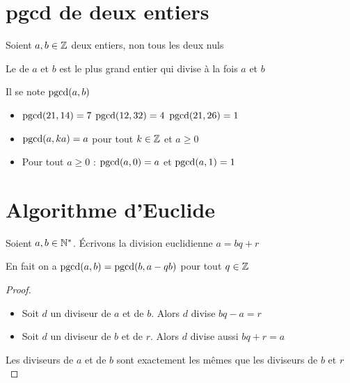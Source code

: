 \section{pgcd de deux entiers}

\begin{frame}
Soient $a,b\in\mathbb{Z}$ deux entiers, non tous les deux nuls

\begin{mydefinition}
Le  de $a$ et $b$ 
est le plus grand entier qui divise à la fois $a$ et $b$
\end{mydefinition}

\pause

Il se note $\mathop{\text{pgcd}}\nolimits(a,b)$

\pause
\bigskip

\begin{exemple}
\begin{itemize}
  \item $\mathop{\text{pgcd}}\nolimits(21,14)=7$ \quad\pause $\mathop{\text{pgcd}}\nolimits(12,32)=4$ \quad\pause $\mathop{\text{pgcd}}\nolimits(21,26)=1$
\pause
  \item $\mathop{\text{pgcd}}\nolimits(a,ka)=a$ \quad pour tout $k \in \mathbb{Z}$ et $a \ge 0$
\pause
  \item Pour tout $a\ge 0$ : $\mathop{\text{pgcd}}\nolimits(a,0)=a$ \pause \quad et \quad  $\mathop{\text{pgcd}}\nolimits(a,1)=1$
\end{itemize}
\end{exemple}
\end{frame}

\section{Algorithme d'Euclide}

\begin{frame}

Soient $a,b \in \mathbb{N}^*$. \'Ecrivons la division euclidienne $a=bq+r$
\begin{lemme}
\label{lem:algoeuclide}
\end{lemme}

\pause
\medskip

En fait on a $\mathop{\text{pgcd}}\nolimits(a,b) = \mathop{\text{pgcd}}\nolimits(b,a-qb)$ pour tout $q\in \mathbb{Z}$

\pause
\medskip

\begin{proof}

\begin{itemize}
  \item Soit $d$ un diviseur de $a$ et de $b$. Alors $d$ divise $bq-a=r$
\pause
  \item Soit $d$ un diviseur de $b$ et de $r$. Alors $d$ divise aussi $bq+r=a$
\end{itemize}
\pause
Les diviseurs de $a$ et de $b$ sont exactement les mêmes que les diviseurs de $b$ et $r$
\end{proof}
\end{frame}


